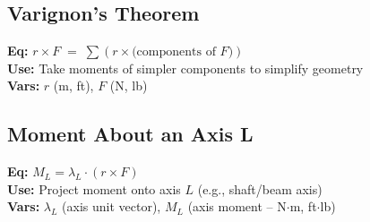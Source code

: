 \documentclass[10pt]{article}
\begin{document}
\begin{multicols}{2}
    \subsection{Varignon's Theorem}
    \textbf{Eq:} $r \times F \;=\; \sum\!\left(r \times \text{(components of }F)\right)$\\
    \textbf{Use:} Take moments of simpler components to simplify geometry\\
    \textbf{Vars:} $r$ (m, ft), $F$ (N, lb)\\[2pt]

    \subsection{Moment About an Axis L}
    \textbf{Eq:} $M_L = \lambda_L \cdot (r \times F)$\\
    \textbf{Use:} Project moment onto axis $L$ (e.g., shaft/beam axis)\\
    \textbf{Vars:} $\lambda_L$ (axis unit vector), $M_L$ (axis moment -- N$\cdot$m, ft$\cdot$lb)\\
\end{multicols}
\end{document}
